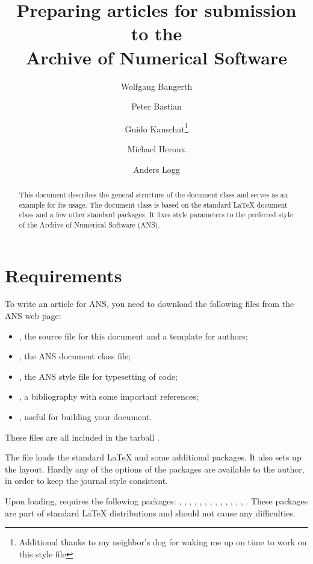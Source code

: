 \documentclass{ansarticle}
\title{Preparing articles for submission to the \\
       Archive of Numerical Software}
\author[1]{Wolfgang Bangerth}
\author[2]{Peter Bastian}
\author[1]{Guido Kanschat\thanks{Additional thanks to my neighbor's dog
  for waking me up on time to work on this style file}}
\author[3]{Michael Heroux}
\author[4]{Anders Logg}
\affil[1]{Department of Mathematics, Texas A\&M University}
\affil[2]{IWR, Universit\"at Heidelberg}
\affil[3]{Sandia National Laboratories}
\affil[4]{Simula Research Laboratory}
\begin{document}

\maketitle

\begin{abstract}
  This document describes the general structure of the
   document class and serves as an example for its
  usage. The  document class is based on the standard
  \LaTeX{}  document class and a few other standard
  packages. It fixes style parameters to the preferred style of the
  Archive of Numerical Software (ANS).
\end{abstract}

\section{Requirements}

To write an article for ANS, you need to download the following files
from the ANS web page:
\begin{itemize}
\item
  , the source file for this document and a template for
  authors;
\item
  , the ANS document class file;
\item
  , the ANS style file for typesetting of code;
\item
  , a bibliography with some important
  references;
\item
  , useful for building your document.
\end{itemize}
These files are all included in the tarball .

The file  loads the standard LaTeX
 and some additional packages. It also sets up the
layout. Hardly any of the options of the packages are available to the
author, in order to keep the journal style consistent.

Upon loading,  requires the following packages:
,
, , ,
,
, ,
,
,
,
,
,
,
.
These packages are part of standard \LaTeX{} distributions and should
not cause any difficulties.
\end{document}
